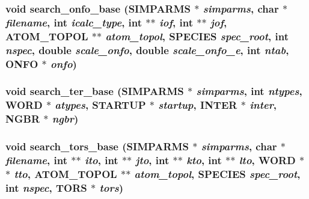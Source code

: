 \subsubsection{\setlength{\rightskip}{0pt plus 5cm}void search\_\-onfo\_\-base ({\bf SIMPARMS} $\ast$ {\em simparms}, char $\ast$ {\em filename}, int {\em icalc\_\-type}, int $\ast$$\ast$ {\em iof}, int $\ast$$\ast$ {\em jof}, {\bf ATOM\_\-TOPOL} $\ast$$\ast$ {\em atom\_\-topol}, {\bf SPECIES} {\em spec\_\-root}, int {\em nspec}, double {\em scale\_\-onfo}, double {\em scale\_\-onfo\_\-e}, int {\em ntab}, {\bf ONFO} $\ast$ {\em onfo})}\label{thomas_2md__searchbase_8c_30fa11c71e4dc2c749545bdaf66091bf}


\subsubsection{\setlength{\rightskip}{0pt plus 5cm}void search\_\-ter\_\-base ({\bf SIMPARMS} $\ast$ {\em simparms}, int {\em ntypes}, {\bf WORD} $\ast$ {\em atypes}, {\bf STARTUP} $\ast$ {\em startup}, {\bf INTER} $\ast$ {\em inter}, {\bf NGBR} $\ast$ {\em ngbr})}\label{thomas_2md__searchbase_8c_400f60a18d9f13a31f74285c6863e44e}


\subsubsection{\setlength{\rightskip}{0pt plus 5cm}void search\_\-tors\_\-base ({\bf SIMPARMS} $\ast$ {\em simparms}, char $\ast$ {\em filename}, int $\ast$$\ast$ {\em ito}, int $\ast$$\ast$ {\em jto}, int $\ast$$\ast$ {\em kto}, int $\ast$$\ast$ {\em lto}, {\bf WORD} $\ast$$\ast$ {\em tto}, {\bf ATOM\_\-TOPOL} $\ast$$\ast$ {\em atom\_\-topol}, {\bf SPECIES} {\em spec\_\-root}, int {\em nspec}, {\bf TORS} $\ast$ {\em tors})}\label{thomas_2md__searchbase_8c_ed95e7a631fddf47882560d88bac50e6}


